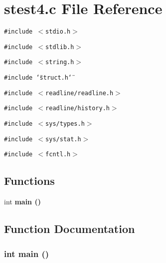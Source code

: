 \section{stest4.c File Reference}
\label{stest4_8c}
{\tt \#include $<$stdio.h$>$}\par
{\tt \#include $<$stdlib.h$>$}\par
{\tt \#include $<$string.h$>$}\par
{\tt \#include \char`\"{}struct.h\char`\"{}}\par
{\tt \#include $<$readline/readline.h$>$}\par
{\tt \#include $<$readline/history.h$>$}\par
{\tt \#include $<$sys/types.h$>$}\par
{\tt \#include $<$sys/stat.h$>$}\par
{\tt \#include $<$fcntl.h$>$}\par
\subsection*{Functions}
\begin{CompactItemize}
\item 
int \bf{main} ()
\end{CompactItemize}


\subsection{Function Documentation}
\subsubsection{\setlength{\rightskip}{0pt plus 5cm}int main ()}\label{stest4_8c_e66f6b31b5ad750f1fe042a706a4e3d4}


